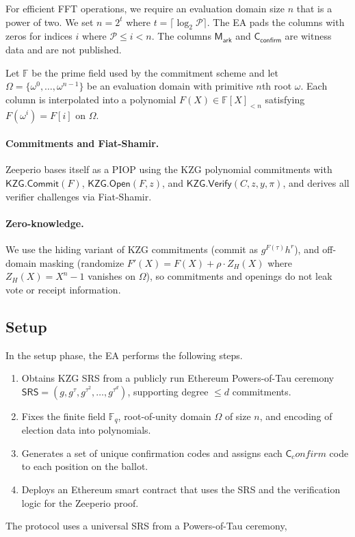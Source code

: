For efficient FFT operations, we require an evaluation domain size $n$ that is a power of two. 
We set $n = 2^t$ where $t = \lceil \log_2 \mathcal{P} \rceil$. 
The EA pads the columns with zeros for indices $i$ where $\mathcal{P} \le i < n$. 
The columns $\mathsf{M_{ark}}$ and $\mathsf{C}_{\mathsf{confirm}}$ are witness data and are not published. 

Let $\mathbb{F}$ be the prime field used by the commitment scheme and let $\Omega=\{\omega^0,\dots,\omega^{n-1}\}$
be an evaluation domain with primitive $n$th root $\omega$. Each column is interpolated into a polynomial
$F(X)\in \mathbb{F}[X]_{<n}$ satisfying $F(\omega^i)=F[i]$ on $\Omega$.

\paragraph{Commitments and Fiat-Shamir.}
Zeeperio bases itself as a PIOP using the KZG polynomial commitments with
$\mathsf{KZG.Commit}(F)$, $\mathsf{KZG.Open}(F,z)$, and $\mathsf{KZG.Verify}(C,z,y,\pi)$, and derives all verifier challenges via Fiat-Shamir.  

\paragraph{Zero-knowledge.}
We use the hiding variant of KZG commitments (commit as $g^{F(\tau)}h^r$), and
off-domain masking (randomize $F'(X)=F(X)+\rho\cdot Z_H(X)$ where $Z_H(X)=X^n-1$ vanishes on $\Omega$),
so commitments and openings do not leak vote or receipt information.  

\subsection{Setup}
In the setup phase, the EA performs the following steps.
\begin{enumerate}[label=(S\arabic*)]
  \item Obtains KZG SRS from a publicly run Ethereum Powers-of-Tau ceremony $\mathsf{SRS}=(g,g^\tau,g^{\tau^2},\dots,g^{\tau^d})$, supporting degree $\le d$ commitments. 
  \item Fixes the finite field $\mathbb{F}_q$, root-of-unity domain $\Omega$ of size $n$, and encoding of election data into polynomials.
  \item Generates a set of unique confirmation codes and assigns each $\mathsf{C}_confirm$ code to each position on the ballot.
  \item Deploys an Ethereum smart contract that uses the SRS and the verification logic for the Zeeperio proof.
\end{enumerate}
The protocol uses a universal SRS from a Powers-of-Tau ceremony,
 

